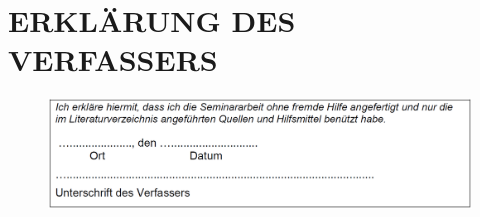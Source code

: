 \documentclass[a4paper,12pt]{article}
\begin{document}

\newpage
{}
\section{ERKLÄRUNG DES VERFASSERS}

\begin{figure}[H]
    \includegraphics[width=\linewidth]{Bilder/Sonstiges/ErklaerungDesVerfassers.png}
\end{figure}
\end{document}
